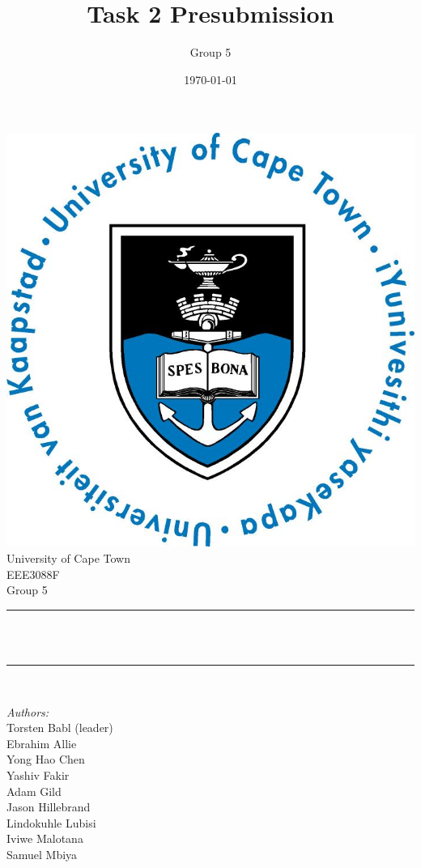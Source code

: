\documentclass[12pt]{article}
\title{Task 2 Presubmission}								%
\author{Group 5}								%
\date{\today}											%
\makeatletter
\let\thetitle\@title
\makeatother
\begin{document}

\begin{titlepage}
	\centering
    \vspace*{0.5 cm}
    \includegraphics[scale = 0.75]{UCT.jpg}\\[1.0 cm]	%
    \LARGE University of Cape Town\\[1.0 cm]	%
	\Large EEE3088F\\				%
	\large Group 5\\				%
	\rule{\linewidth}{0.2 mm} \\[0.4 cm]
	{ \huge \bfseries \thetitle}\\
	\rule{\linewidth}{0.2 mm} \\[0.5 cm]
	
	\begin{minipage}{0.4\textwidth}
		\begin{flushleft} \large
			\emph{Authors:}\\
      Torsten Babl (leader)\\
      Ebrahim Allie\\
      Yong Hao Chen\\
      Yashiv Fakir\\
      Adam Gild\\
      Jason Hillebrand\\
      Lindokuhle Lubisi\\
      Iviwe Malotana\\
      Samuel Mbiya
      

\end{flushleft}
\end{minipage}
\end{titlepage}
\end{document}
